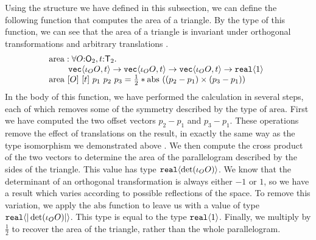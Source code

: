 \begin{example}
  Using the structure we have defined in this subsection, we can
  define the following function that computes the area of a
  triangle. By the type of this function, we can see that the area of
  a triangle is invariant under orthogonal transformations and
  arbitrary translations .
  \begin{displaymath}
    \begin{array}{@{}l}
      \mathrm{area} : \forall O\mathord:\SynOrth_2, t\mathord:\SynTransl_2.\ \\
      \hspace{0.8cm}\tyPrim{vec}{\iota_OO, t} \to \tyPrim{vec}{\iota_OO, t} \to \tyPrim{vec}{\iota_OO, t} \to \tyPrim{real}{1} \\
      \mathrm{area}\ [O]\ [t]\ p_1\ p_2\ p_3 = \frac{1}{2} * \mathrm{abs}\ ((p_2 - p_1) \times (p_3 - p_1))
    \end{array}
  \end{displaymath}
  In the body of this function, we have performed the calculation in
  several steps, each of which removes some of the symmetry described
  by the type of $\mathrm{area}$. First we have computed the two
  offset vectors $p_2 - p_1$ and $p_3 - p_1$. These operations remove
  the effect of translations on the result, in exactly the same way as
  the type isomorphism we demonstrated above . We then
  compute the cross product of the two vectors to determine the area
  of the parallelogram described by the sides of the triangle. This
  value has type $\texttt{real}\langle \det (\iota_O O) \rangle$. We know that the
  determinant of an orthogonal transformation is always either $-1$ or
  $1$, so we have a result which varies according to possible
  reflections of the space. To remove this variation, we apply the
  $\mathrm{abs}$ function to leave us with a value of type
  $\texttt{real}\langle |\det (\iota_O O)| \rangle$. This type is equal to the type
  $\texttt{real}\langle 1 \rangle$. Finally, we multiply by $\frac{1}{2}$ to recover
  the area of the triangle, rather than the whole parallelogram.
\end{example}


